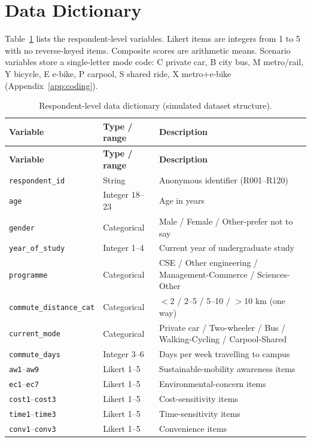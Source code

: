 \documentclass[11pt,a4paper]{article}
\newcommand{\code}[1]{\texttt{#1}}
\begin{document}
\section{Data Dictionary}
\label{sec:datadict}

Table~\ref{tab:datadict} lists the respondent-level variables. Likert items are integers from 1 to 5
with no reverse-keyed items. Composite scores are arithmetic means. Scenario variables store a
single-letter mode code: C private car, B city bus, M metro/rail, Y bicycle, E e-bike, P carpool,
S shared ride, X metro$+$e-bike (Appendix~\ref{app:coding}).

\footnotesize
\begin{longtable}{@{}p{3.5cm}p{1.9cm}p{8.2cm}@{}}
\caption{Respondent-level data dictionary (simulated dataset structure).}
\label{tab:datadict}\\
\toprule
\textbf{Variable} & \textbf{Type / range} & \textbf{Description}\\
\midrule
\endfirsthead
\toprule
\textbf{Variable} & \textbf{Type / range} & \textbf{Description}\\
\midrule
\endhead
\bottomrule
\endlastfoot
\code{respondent\_id} & String & Anonymous identifier (R001--R120)\\
\code{age} & Integer 18--23 & Age in years\\
\code{gender} & Categorical & Male / Female / Other-prefer not to say\\
\code{year\_of\_study} & Integer 1--4 & Current year of undergraduate study\\
\code{programme} & Categorical & CSE / Other engineering / Management-Commerce / Sciences-Other\\
\code{commute\_distance\_cat} & Categorical & $<$2 / 2--5 / 5--10 / $>$10 km (one way)\\
\code{current\_mode} & Categorical & Private car / Two-wheeler / Bus / Walking-Cycling / Carpool-Shared\\
\code{commute\_days} & Integer 3--6 & Days per week travelling to campus\\
\code{aw1}--\code{aw9} & Likert 1--5 & Sustainable-mobility awareness items\\
\code{ec1}--\code{ec7} & Likert 1--5 & Environmental-concern items\\
\code{cost1}--\code{cost3} & Likert 1--5 & Cost-sensitivity items\\
\code{time1}--\code{time3} & Likert 1--5 & Time-sensitivity items\\
\code{conv1}--\code{conv3} & Likert 1--5 & Convenience items\\

\end{longtable}
\end{document}

